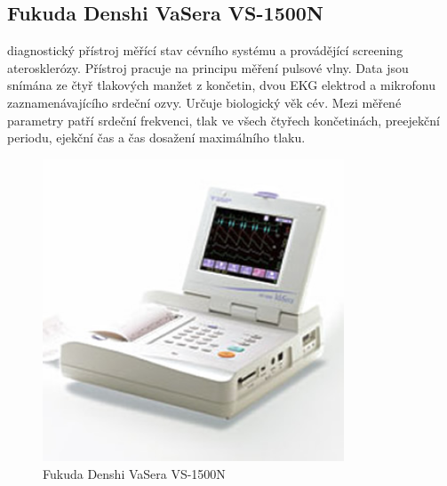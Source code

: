 \subsection{Fukuda Denshi VaSera VS-1500N}
diagnostický přístroj měřící stav cévního systému a provádějící screening aterosklerózy. Přístroj pracuje na principu měření pulsové vlny. Data jsou snímána ze čtyř tlakových manžet z končetin, dvou EKG elektrod a mikrofonu zaznamenávajícího srdeční ozvy.
Určuje biologický věk cév. Mezi měřené parametry patří srdeční frekvenci, tlak ve všech čtyřech končetinách, preejekční periodu, ejekční čas a čas dosažení maximálního tlaku.
\begin{figure}[H]
    \caption{Fukuda Denshi VaSera VS-1500N \cite{cite:Arteriograph}}
    \includegraphics[width=0.8\textwidth]{pictures/vs_1500n.jpg}
\end{figure}